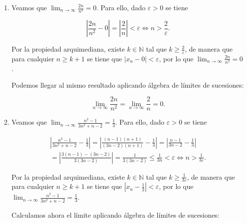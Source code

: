 \documentclass[
  spanish,
  a4paper,
]{scrreport}
\theoremstyle{definition}
\theoremstyle{remark}
\begin{document}
\begin{tcolorbox}[enhanced jigsaw, arc=.35mm, bottomrule=.15mm, bottomtitle=1mm, breakable, colback=white, colbacktitle=quarto-callout-tip-color!10!white, colframe=quarto-callout-tip-color-frame, coltitle=black, left=2mm, leftrule=.75mm, opacityback=0, opacitybacktitle=0.6, rightrule=.15mm, title=\textcolor{quarto-callout-tip-color}{\faLightbulb}\hspace{0.5em}{Solución}, titlerule=0mm, toprule=.15mm, toptitle=1mm]

\begin{enumerate}
\def\labelenumi{\alph{enumi}.}
\item
  Veamos que \(\lim_{n\to\infty}\frac{2n}{n^2}=0\). Para ello, dado
  \(\varepsilon>0\) se tiene

  \[
  \left|\frac{2n}{n^2}-0\right| 
  = \left|\frac{2}{n}\right| < \varepsilon 
  \Leftrightarrow n > \frac{2}{\varepsilon}.
  \]

  Por la propiedad arquimediana, existe \(k\in \mathbb{N}\) tal que
  \(k\geq \frac{2}{\varepsilon}\), de manera que para cualquier
  \(n\geq k+1\) se tiene que \(|x_n-0|<\varepsilon\), por lo que
  \(\lim_{n\to\infty}\frac{2n}{n^2}=0\).

  Podemos llegar al mismo resultado aplicando álgebra de límites de
  sucesiones:

  \[
  \lim_{n\to\infty}\frac{2n}{n^2} = \lim_{n\to\infty}\frac{2}{n}= 0.
  \]
\item
  Veamos que \(\lim_{n\to\infty}\frac{n^2-1}{3n^2+n-2}=\frac{1}{3}\).
  Para ello, dado \(\varepsilon>0\) se tiene

  \begin{gather}
  \left|\frac{n^2-1}{3n^2+n-2}-\frac{1}{3}\right| 
  = \left|\frac{(n-1)(n+1)}{(3n-2)(n+1)}-\frac{1}{3}\right| 
  = \left|\frac{n-1}{3n-2}-\frac{1}{3}\right| \\ 
  = \left|\frac{3(n-1)-(3n-2)}{3(3n-2)}\right| 
  = \frac{1}{3(3n-2)} \leq \frac{1}{3n} < \varepsilon 
  \Leftrightarrow n > \frac{1}{3\varepsilon}.
  \end{gather}

  Por la propiedad arquimediana, existe \(k\in \mathbb{N}\) tal que
  \(k\geq \frac{1}{3\varepsilon}\), de manera que para cualquier
  \(n\geq k+1\) se tiene que
  \(\left|x_n-\frac{1}{3}\right|<\varepsilon\), por lo que
  \(\lim_{n\to\infty}\frac{n^2-1}{3n^2+n-2}=\frac{1}{3}\).

  Calculamos ahora el límite aplicando álgebra de límites de sucesiones:


\end{enumerate}
\end{tcolorbox}
\end{document}
